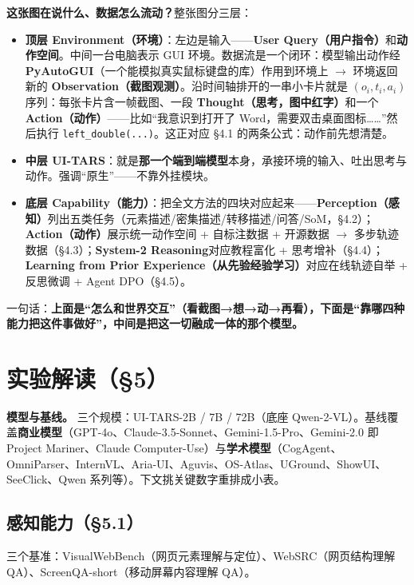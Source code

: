\documentclass[11pt,UTF8,fontset=fandol]{ctexart}
\begin{document}
\textbf{这张图在说什么、数据怎么流动？}整张图分三层：

\begin{itemize}[leftmargin=1.5em]
\item \textbf{顶层 Environment（环境）}：左边是输入——\textbf{User Query（用户指令）}和\textbf{动作空间}。中间一台电脑表示 GUI 环境。数据流是一个闭环：模型输出动作经 \textbf{PyAutoGUI}（一个能模拟真实鼠标键盘的库）作用到环境上 $\rightarrow$ 环境返回新的 \textbf{Observation（截图观测）}。沿时间轴排开的一串小卡片就是 $(o_i,t_i,a_i)$ 序列：每张卡片含一帧截图、一段 \textbf{Thought（思考，图中红字）}和一个 \textbf{Action（动作）}——比如“我意识到打开了 Word，需要双击桌面图标……”然后执行 \texttt{left\_double(...)}。这正对应 §4.1 的两条公式：动作前先想清楚。
\item \textbf{中层 UI-TARS}：就是\textbf{那一个端到端模型}本身，承接环境的输入、吐出思考与动作。强调“原生”——不靠外挂模块。
\item \textbf{底层 Capability（能力）}：把全文方法的四块对应起来——\textbf{Perception（感知）}列出五类任务（元素描述/密集描述/转移描述/问答/SoM，§4.2）；\textbf{Action（动作）}展示统一动作空间 + 自标注数据 + 开源数据 $\rightarrow$ 多步轨迹数据（§4.3）；\textbf{System-2 Reasoning}对应教程富化 + 思考增补（§4.4）；\textbf{Learning from Prior Experience（从先验经验学习）}对应在线轨迹自举 + 反思微调 + Agent DPO（§4.5）。
\end{itemize}

一句话：\textbf{上面是“怎么和世界交互”（看截图→想→动→再看），下面是“靠哪四种能力把这件事做好”，中间是把这一切融成一体的那个模型。}

\section{实验解读（§5）}

\textbf{模型与基线。} 三个规模：UI-TARS-2B / 7B / 72B（底座 Qwen-2-VL）。基线覆盖\textbf{商业模型}（GPT-4o、Claude-3.5-Sonnet、Gemini-1.5-Pro、Gemini-2.0 即 Project Mariner、Claude Computer-Use）与\textbf{学术模型}（CogAgent、OmniParser、InternVL、Aria-UI、Aguvis、OS-Atlas、UGround、ShowUI、SeeClick、Qwen 系列等）。下文挑关键数字重排成小表。

\subsection{感知能力（§5.1）}

三个基准：VisualWebBench（网页元素理解与定位）、WebSRC（网页结构理解 QA）、ScreenQA-short（移动屏幕内容理解 QA）。
\end{document}
